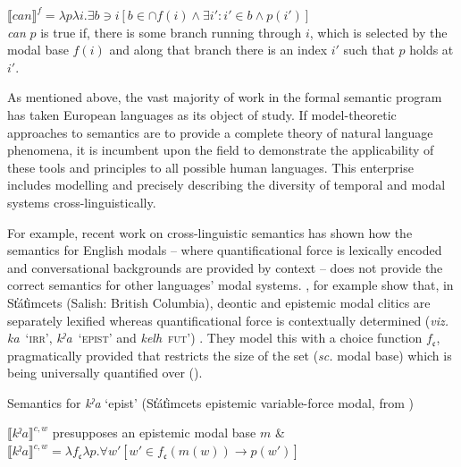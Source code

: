\documentclass[12pt,dvipsnames]{report}
\providecommand{\denote}[2][]{\ensuremath{\llbracket{#2}\rrbracket^{#1}}}
\begin{document}
\a$ \denote[f]{\textit{can}}=\lambda p\lambda i.\exists b\ni i[b\in\cap f(i)\wedge \exists i':i'\in b\wedge p(i')] $\\
\textit{ can } $ p $ is true if, there is some branch running through $ i $, which is selected by the modal base $ f(i) $ and along that branch there is an index $ i' $ such that $ p $ holds at $ i' $.


\xe



As mentioned above, the vast majority of work in the formal semantic program has taken European languages as its object of study. If model-theoretic approaches to semantics are to provide a complete theory of natural language phenomena, it is incumbent upon the field to demonstrate the applicability of these tools and principles to all possible human languages. This enterprise includes modelling and precisely describing the diversity of temporal and modal systems cross-linguistically.

For example, recent work on cross-linguistic semantics has shown how the semantics for English modals -- where quantificational force is lexically encoded and conversational backgrounds are provided by context -- does not provide the correct semantics for other languages' modal systems. \citet{Rullmann2008}, for example show that, in St̓át̓imcets (Salish: British Columbia), deontic and epistemic modal clitics are separately lexified whereas quantificational force is contextually determined (\textit{viz.} \textit{ka}~`\textsc{irr}', \textit{kˀa}~`\textsc{epist}' and \textit{kelh}~\textsc{fut}') \citep[see also][]{Peterson2010,Matthewson2010}. They model this with a choice function $ f_{\mathfrak c}$, pragmatically provided that restricts the size of the set (\textit{sc.} modal base) which is being universally quantified over (\nextx).

\pex Semantics for \textit{kˀa} `\gls{epist}' (St̓át̓imcets epistemic variable-force modal, from \citealp[340]{Rullmann2008})

\denote[c,w]{\textit{kˀa}} presupposes an epistemic modal base $ m $ \&\\
$ \denote[c,w]{\textit{kˀa}}=\lambda f_{\mathfrak c}\lambda p.\forall w'[w'\in f_{\mathfrak c}(m(w))\to p(w')]$
\xe
\end{document}
